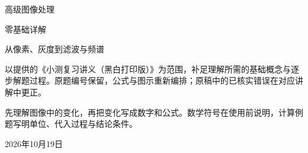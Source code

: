 \documentclass[11pt,a4paper]{article}
\begin{document}
\begin{titlepage}
\vspace*{20mm}
{\Huge\sffamily 高级图像处理\par}\vspace{8mm}
{\LARGE 零基础详解\par}\vspace{12mm}
{\large 从像素、灰度到滤波与频谱\par}
\vfill
\noindent 以提供的《小测复习讲义（黑白打印版）》为范围，补足理解所需的基础概念与逐步解题过程。原题编号保留，公式与图示重新编排；原稿中的已核实错误在对应讲解中更正。\par
\vspace{6mm}
\noindent 先理解图像中的变化，再把变化写成数字和公式。数学符号在使用前说明，计算例题写明单位、代入过程与结论条件。\par
\vspace{10mm}
2026年10月19日
\end{titlepage}
\setcounter{tocdepth}{2}\tableofcontents\clearpage







\end{document}
